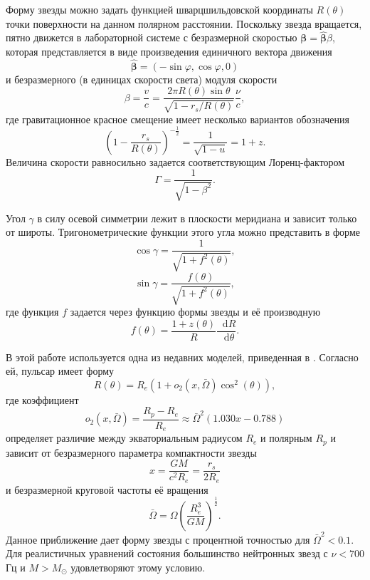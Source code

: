\documentclass[14pt,a4paper]{extarticle}
\newcommand{\be}{\begin{equation}}
\newcommand{\ee}{\end{equation}}
\newcommand*\df {\mathop{}\!\mathrm{d}}
\begin{document}
		    Форму звезды можно задать функцией 
		    	 шварцшильдовской координаты 
		    $R(\theta)$
		     точки поверхности на данном полярном расстоянии. 
		    Поскольку звезда вращается, пятно движется в лабораторной системе с безразмерной скоростью $\bm{\beta}=\bm{\hat\beta} \beta$, которая представляется в виде произведения единичного вектора движения 
		    \be\label{betahat}
		    	\bm{\hat\beta}=(-\sin\varphi,\cos\varphi,0)
		    \ee
		    и безразмерного (в единицах скорости света) модуля скорости 
		    \be
		    	\beta=\frac v c = \frac{2 \pi R(\theta) \sin\theta}{\sqrt{1-r_s/R(\theta)}} \frac{\nu}{c},
		    \ee
		    где гравитационное красное смещение имеет несколько вариантов обозначения
		    \be
		    	\left(1-\frac{r_s}{R(\theta)}\right)^{-\frac12}=\frac1{\sqrt{1-u}}=1+z.
		    \ee
		    Величина скорости равносильно задается соответствующим Лоренц-фактором
		    \be\label{Lorentz-factor}
		    	\Gamma=\frac1{\sqrt{1-\beta^2}}.
		    \ee

		    Угол $\gamma$ в силу осевой симметрии лежит в плоскости меридиана и зависит только от широты.
		    Тригонометрические функции этого угла можно представить в форме 
		    \be
		    \cos\gamma=\frac1{\sqrt{ 1+ f^2(\theta) }},
		    \ee
		    \be
		    \sin\gamma=\frac{f(\theta)}{\sqrt{ 1+ f^2(\theta) }},
		    \ee
		    где функция $f$ задается через функцию формы звезды и её производную
		    \be\label{eq:shape}
				f(\theta)= \frac{1+z(\theta)}R\frac{\df R}{\df \theta}.
			\ee

		    В этой работе используется одна из недавних моделей, приведенная в \cite{AlGendy2014}.
		    Согласно ей, пульсар имеет форму
		    \be
		    	R(\theta)=R_e\left(1+o_2(x,\bar\Omega)\cos^2(\theta)\right), 
		    \ee 
		    где коэффициент
		    \be
		    o_2(x,\bar\Omega)=\frac{R_p-R_e}{R_e}\approx\bar\Omega^2(1.030x-0.788)
		    \ee
		    определяет различие между экваториальным радиусом $R_e$ и полярным $R_p$ и зависит от 
		    безразмерного параметра компактности звезды
		    \be
		    x=\frac{GM}{c^2R_e}=\frac{r_s}{2R_e}
		    \ee
		    и безразмерной круговой частоты её вращения
		    \be
		    \bar\Omega=\Omega\left(\frac{R_e^3}{GM}\right)^{\frac12}.
		    \ee
		    Данное приближение дает форму звезды с процентной точностью для $\bar\Omega^2<0.1$. 
		    Для реалистичных уравнений состояния большинство нейтронных звезд с $\nu<700$ Гц и $M>M_{\odot}$ удовлетворяют этому условию. 
\end{document}
